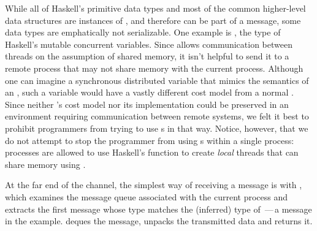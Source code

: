 \documentclass[preprint]{sigplanconf}
\begin{document}
While all of Haskell's primitive data types and most of the common higher-level data structures are instances of , and therefore can be part of a message, some data types are emphatically not serializable. One example is , the type of Haskell's mutable concurrent variables. Since  allows communication between threads on the assumption of shared memory, it isn't helpful to send it to a remote process that may not share memory with the current process. Although one can imagine a synchronous distributed variable that mimics the semantics of an , such a variable would have a vastly different cost model from a normal . Since neither 's cost model nor its implementation could be preserved in an environment requiring communication between remote systems, we felt it best to prohibit programmers from trying to use s in that way.  Notice, however, that we do not attempt to stop the programmer from using s within a single process: processes are allowed to use Haskell's  function to create \emph{local} threads that can share memory using .

At the far end of the channel, the simplest way of receiving a message is with , which
examines the message queue associated with the current process and extracts the first message whose type matches the (inferred) type of \,---\,a  message in the example.  
 deques the message, unpacks the transmitted data and returns it.


\end{document}

